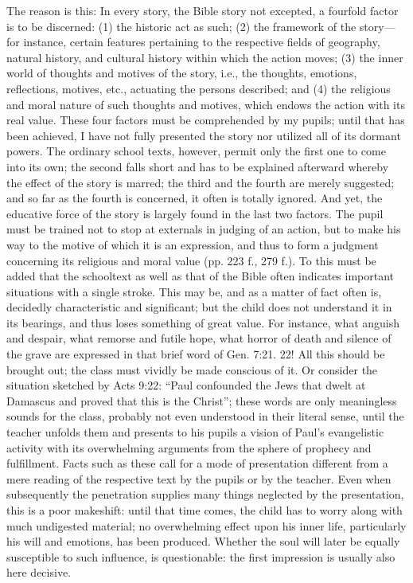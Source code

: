 The reason is this: In every story, the Bible story not excepted, a fourfold factor is to be discerned: (1) the historic act as such; (2) the framework of the story—for instance, certain features pertaining to the respective fields of geography, natural history, and cultural history within which the action moves; (3) the inner world of thoughts and motives of the story, i.e., the thoughts, emotions, reflections, motives, etc., actuating the persons described; and (4) the
religious and moral nature of such thoughts and motives, which endows the action with its real value. These four factors must be comprehended by my pupils; until that has been achieved, I have not fully presented the story nor utilized all of its dormant powers. The ordinary school texts, however, permit only the first one to come into its own; the second falls short and has to be explained afterward whereby the effect of the story is marred; the third and the fourth are merely suggested; and so far as the fourth is concerned, it often is totally ignored. And yet, the educative force of the story is largely found in the last two factors. The pupil must be trained not to stop at externals in judging of an action, but to make his way to the motive of which it is an expression, and thus to form a judgment concerning its religious and moral value (pp. 223 f., 279 f.). To this must be added that the schooltext as well as that of the Bible often indicates important situations with a single stroke. This may be, and as a matter of fact often is, decidedly characteristic and significant; but the child does not understand it in its bearings, and thus loses something of great value. For instance, what anguish and despair, what remorse and futile hope, what horror of death and silence of the grave are expressed in that brief word of Gen. 7:21. 22! All this should be brought out; the class must vividly be made conscious of it. Or consider the situation sketched by Acts 9:22: “Paul confounded the Jews that dwelt at Damascus and proved that this is the Christ”; these words are only meaningless sounds for the class, probably not even understood in their literal sense, until the teacher unfolds them and presents to his pupils a vision of Paul’s evangelistic activity with its overwhelming arguments from the sphere of prophecy and fulfillment. Facts such as these call for a mode of presentation different from a mere reading of the respective text by the pupils or by the teacher. Even
when subsequently the penetration supplies many things neglected by the presentation, this is a poor makeshift: until that time comes, the child has to worry along with much undigested material; no overwhelming effect upon his inner life, particularly his will and emotions, has been produced. Whether the soul will later be equally susceptible to such influence, is questionable: the first impression is usually also here decisive.

